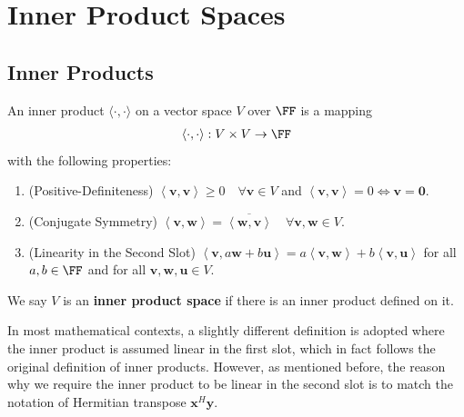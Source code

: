 \documentclass[thmcnt=section, color=blue, 12pt]{my-elegantbook}
\begin{document}

\chapter{Inner Product Spaces}


\section{Inner Products}


\begin{definition}
    An inner product $\langle \cdot, \cdot \rangle$ on a vector space $V$ over $\FF$ is a mapping 
    \begin{align*}
        \langle \cdot, \cdot \rangle: V \times V \to \FF
    \end{align*}
    with the following properties:
    \begin{enumerate}
        \item (Positive-Definiteness) $\left\langle \mathbf{v}, \mathbf{v} \right\rangle \geq 0 \quad \forall \mathbf{v} \in V$ and $\left\langle \mathbf{v}, \mathbf{v} \right\rangle = 0 \iff \mathbf{v} = \mathbf{0}$.
        \item (Conjugate Symmetry) $\left\langle \mathbf{v}, \mathbf{w} \right\rangle = \overline{\left\langle \mathbf{w}, \mathbf{v} \right\rangle} \quad \forall \mathbf{v}, \mathbf{w} \in V$.
        \item (Linearity in the Second Slot) $\left\langle \mathbf{v}, a \mathbf{w} + b \mathbf{u} \right\rangle = a \left\langle \mathbf{v}, \mathbf{w} \right\rangle + b \left\langle \mathbf{v}, \mathbf{u} \right\rangle$ for all $a, b \in \FF $ and for all $\mathbf{v}, \mathbf{w}, \mathbf{u} \in V$.
    \end{enumerate}
    We say $V$ is an \textbf{inner product space}  if there is an inner product defined on it.
\end{definition}

\begin{note}
    In most mathematical contexts, a slightly different definition is adopted where the inner product is assumed linear in the first slot, which in fact follows the original definition of inner products. However, as mentioned before, the reason why we require the inner product to be linear in the second slot is to match the notation of Hermitian transpose $\mathbf{x}^H \mathbf{y}$.
\end{note}
\end{document}
